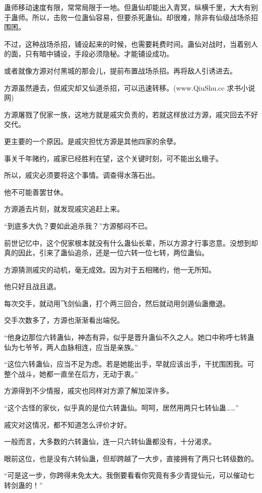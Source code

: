 \begin{this_body}
蛊师移动速度有限，常常局限于一地。但蛊仙却能出入青冥，纵横千里，大大有别于蛊师。所以，击败一位蛊仙容易，但要杀死蛊仙。却很难，除非有仙级战场杀招围困。

不过，这种战场杀招，铺设起来的时候，也需要耗费时间。蛊仙对战时，当着别人的面，只有暗中铺设，手段必须隐秘。才能铺设成功。

或者就像方源对付黑城的那会儿，提前布置战场杀招。再将敌人引诱进去。

方源虽然遁去，但戚灾却又仙道杀招，可以迅速转移。(www.QiuShu.cc 求书小说网)

方源屠戮了倪家一族，这地方就是戚灾负责的，若就这样放过方源，戚灾回去不好交代。

更主要的一个原因。是戚灾担忧方源是其他四家的余孽。

事关千年赌约，戚家已经胜利在望，这个关键时刻，可不能出幺蛾子。

所以，戚灾必须要将这个事情。调查得水落石出。

他不可能善罢甘休。

方源遁去片刻，就发现戚灾追赶上来。

“到底多大仇？要如此追杀我？”方源郁闷不已。

前世记忆中，这个倪家根本就没有什么蛊仙长辈，所以方源才行事恣意。没想到却真的因此，引来了蛊仙追杀，还是一位六转一位七转，两位蛊仙。

方源猜测戚灾的动机，毫无成效。因为对于五相赌约，他一无所知。

他只好且战且退。

每次交手，就动用飞剑仙蛊，打个两三回合，然后就动用剑遁仙蛊撤退。

交手次数多了，方源也渐渐看出端倪。

“他身边那位六转蛊仙，神态有异，似乎是晋升蛊仙不久之人。她口中称呼七转蛊仙为七爷爷，两人血脉相连，应当是亲族。”

“这位六转蛊仙，应当不足为虑。若是她能出手，早就应该出手，干扰围困我。可整个战斗，她都一直坐在后方，无动于衷。”

方源得到不少情报，戚灾也同样对方源了解加深许多。

“这个古怪的家伙，似乎真的是位六转蛊仙。呵呵，居然用两只七转仙蛊……”

戚灾对这情况，都不知道怎么评价才好。

一般而言，大多数的六转蛊仙，连一只六转仙蛊都没有，十分渴求。

眼前这位，也是没有六转仙蛊，但却跨越了一大步，直接拥有了两只七转级数的。

“可是这一步，你跨得未免太大。我倒要看看你究竟有多少青提仙元，可以催动七转剑蛊的！”


\end{this_body}
